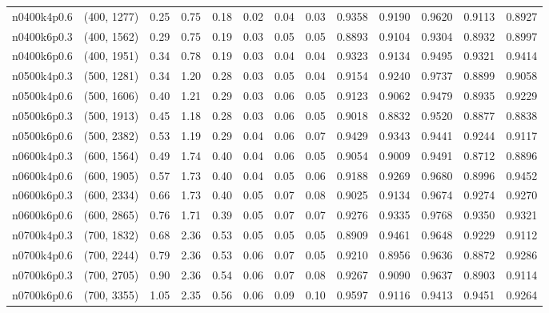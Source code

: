 \begin{tabular}{llrrrrrrrrrrr}
n0400k4p0.6 &   (400, 1277) &   0.25 &   0.75 &  0.18 & 0.02 &  0.04 &   0.03 &   0.9358 &   0.9190 &    0.9620 &     0.9113 &      0.8927 \\
n0400k6p0.3 &   (400, 1562) &   0.29 &   0.75 &  0.19 & 0.03 &  0.05 &   0.05 &   0.8893 &   0.9104 &    0.9304 &     0.8932 &      0.8997 \\
n0400k6p0.6 &   (400, 1951) &   0.34 &   0.78 &  0.19 & 0.03 &  0.04 &   0.04 &   0.9323 &   0.9134 &    0.9495 &     0.9321 &      0.9414 \\
n0500k4p0.3 &   (500, 1281) &   0.34 &   1.20 &  0.28 & 0.03 &  0.05 &   0.04 &   0.9154 &   0.9240 &    0.9737 &     0.8899 &      0.9058 \\
n0500k4p0.6 &   (500, 1606) &   0.40 &   1.21 &  0.29 & 0.03 &  0.06 &   0.05 &   0.9123 &   0.9062 &    0.9479 &     0.8935 &      0.9229 \\
n0500k6p0.3 &   (500, 1913) &   0.45 &   1.18 &  0.28 & 0.03 &  0.06 &   0.05 &   0.9018 &   0.8832 &    0.9520 &     0.8877 &      0.8838 \\
n0500k6p0.6 &   (500, 2382) &   0.53 &   1.19 &  0.29 & 0.04 &  0.06 &   0.07 &   0.9429 &   0.9343 &    0.9441 &     0.9244 &      0.9117 \\
n0600k4p0.3 &   (600, 1564) &   0.49 &   1.74 &  0.40 & 0.04 &  0.06 &   0.05 &   0.9054 &   0.9009 &    0.9491 &     0.8712 &      0.8896 \\
n0600k4p0.6 &   (600, 1905) &   0.57 &   1.73 &  0.40 & 0.04 &  0.05 &   0.06 &   0.9188 &   0.9269 &    0.9680 &     0.8996 &      0.9452 \\
n0600k6p0.3 &   (600, 2334) &   0.66 &   1.73 &  0.40 & 0.05 &  0.07 &   0.08 &   0.9025 &   0.9134 &    0.9674 &     0.9274 &      0.9270 \\
n0600k6p0.6 &   (600, 2865) &   0.76 &   1.71 &  0.39 & 0.05 &  0.07 &   0.07 &   0.9276 &   0.9335 &    0.9768 &     0.9350 &      0.9321 \\
n0700k4p0.3 &   (700, 1832) &   0.68 &   2.36 &  0.53 & 0.05 &  0.05 &   0.05 &   0.8909 &   0.9461 &    0.9648 &     0.9229 &      0.9112 \\
n0700k4p0.6 &   (700, 2244) &   0.79 &   2.36 &  0.53 & 0.06 &  0.07 &   0.05 &   0.9210 &   0.8956 &    0.9636 &     0.8872 &      0.9286 \\
n0700k6p0.3 &   (700, 2705) &   0.90 &   2.36 &  0.54 & 0.06 &  0.07 &   0.08 &   0.9267 &   0.9090 &    0.9637 &     0.8903 &      0.9114 \\
n0700k6p0.6 &   (700, 3355) &   1.05 &   2.35 &  0.56 & 0.06 &  0.09 &   0.10 &   0.9597 &   0.9116 &    0.9413 &     0.9451 &      0.9264 \\

\end{tabular}
